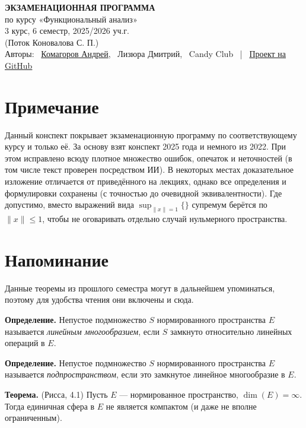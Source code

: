 \documentclass[12pt, a4paper]{article}
\makeatletter
\renewcommand{\tableofcontents}{\@starttoc{toc}}
\renewcommand{\le}{\leqslant}  %
\makeatother
\begin{document}
\begin{center}
    \Large \textbf{ЭКЗАМЕНАЦИОННАЯ ПРОГРАММА}\\
    \large по курсу «Функциональный анализ»\\
    3 курс, 6 семестр, 2025/2026 уч.г.\\
    (Поток Коновалова С. П.) \\
    \normalsize
    \vspace{0.8em}
    Авторы: \ \href{https://t.me/andreyko2742}{Комагоров Андрей}, \ Лизюра Дмитрий, \ Candy Club \ | \ \href{https://github.com/LecturesTexClub/lectures_tex_club}{Проект на GitHub}
\end{center}

\tableofcontents

\section*{Примечание}

Данный конспект покрывает экзаменационную программу по соответствующему курсу и только её. За основу взят конспект 2025 года и немного из 2022. При этом исправлено всюду плотное множество ошибок, опечаток и неточностей (в том числе текст проверен посредством ИИ). В некоторых местах доказательное изложение отличается от приведённого на лекциях, однако все определения и формулировки сохранены (с точностью до очевидной эквивалентности). Где допустимо, вместо выражений вида $\sup_{\|x\| = 1}\{\}$ супремум берётся по $\|x\| \le 1$, чтобы не оговаривать отдельно случай нульмерного пространства.

\section*{Напоминание}
 
Данные теоремы из прошлого семестра могут в дальнейшем упоминаться, поэтому для удобства чтения они включены и сюда.

\textbf{Определение.} Непустое подмножество $S$ нормированного пространства $E$ называется \textit{линейным многообразием}, если $S$ замкнуто относительно линейных операций в $E$.

\textbf{Определение.} Непустое подмножество $S$ нормированного пространства $E$ называется \textit{подпространством}, если это замкнутое линейное многообразие в $E$.
 
 \label{th:4-1} \textbf{Теорема.} (Рисса, 4.1) Пусть $E$ --- нормированное пространство, $\dim(E) = \infty$.
Тогда единичная сфера в $E$ не является компактом (и даже не вполне ограниченным).
 
\end{document}
